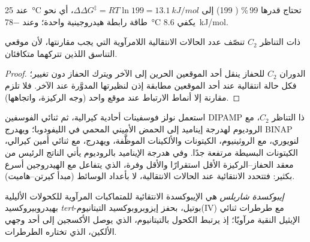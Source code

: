 عند \qty{25}{\celsius} تحتاج  قدرها 99\,\% ( 199) إلى $\Delta\Delta G^\ddagger = RT\ln 199 = \qty{13.1}{kJ/mol}$، أي نحو طاقة
رابطة هيدروجينية واحدة؛ وعند \qty{-78}{\celsius} يكفي \qty{8.6}{kJ/mol}.

\begin{proposition}\label{prop:b3:asymmetric-synthesis:c2}
 ذات التناظر $C_2$ تنصّف عدد الحالات الانتقالية اللامرآوية
التي يجب مقارنتها، لأن موقعي التناسق اللذين تتركهما
متكافئان.
\end{proposition}

\begin{proof}
الدوران $C_2$ للحفاز ينقل أحد الموقعين الحرين إلى الآخر ويترك
الحفاز دون تغيير؛ فكل حالة انتقالية عند أحد الموقعين مطابقة إذن
لنظيرتها المدوَّرة عند الآخر. فلا تلزم مقارنة إلا أنماط الارتباط عند موقع واحد (وجه الركيزة،
واتجاهها).
\end{proof}

استعمل نولز فوسفينات أحادية كيرالية، ثم ثنائي الفوسفين DIPAMP ذا التناظر $C_2$، مع الروديوم
لهدرجة إيناميد إلى الحمض الأميني المحمي في الليفودوبا؛ ويهدرج BINAP لنويوري،
مع الروثينيوم، الكيتونات والألكينات الموظَّفة، ويهدرج،
مع ثنائي أمين كيرالي، الكيتونات البسيطة  مرتفعة جدًا. وفي
هدرجة الإيناميد بالروديوم يأتي الناتج الرئيس من معقد الحفاز--الركيزة
الأقل استقرارًا والأقل وفرة، الذي يتفاعل مع الهيدروجين أسرع بكثير: فتتحدد
الانتقائية عند الحالات الانتقالية، لا بأعداد
الوسائط (مبدأ كيرتن--هاميت).

\begin{definition}\label{def:b3:asymmetric-synthesis:sharpless}
\emph{إيبوكسدة شاربلس} هي
الإيبوكسدة الانتقائية للمتماكبات المرآوية للكحولات الأليلية بهيدروبيروكسيد \textit{tert}-بوتيل،
بحفز إيزوبروبوكسيد التيتانيوم(IV) مع طرطرات ثنائي الإيثيل النقية مرآويًا؛ إذ يرتبط
الكحول بالتيتانيوم، الذي يوصل الأكسجين إلى أحد وجهي
الألكين، الذي تختاره الطرطرات.
\end{definition}


